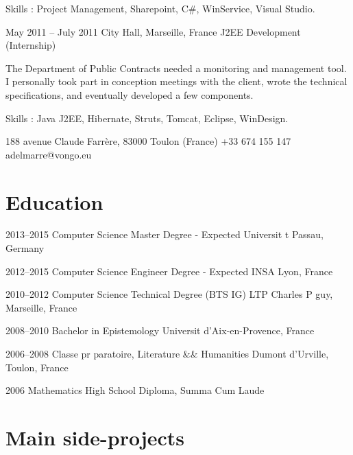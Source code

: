 \documentclass[fontsize=10pt]{tccv}
\begin{document}
\begin{eventlist}
Skills : Project Management, Sharepoint, C#, WinService, Visual Studio.

\item{May 2011 -- July 2011}
     {City Hall, Marseille, France}
     {J2EE Development (Internship)}

The Department of Public Contracts needed a monitoring and management tool.
I personally took part in conception meetings with the client, wrote the technical specifications, and eventually developed a few components.

Skills : Java J2EE, Hibernate, Struts, Tomcat, Eclipse, WinDesign.

\end{eventlist}

\personal
    {188 avenue Claude Farrère, 83000 Toulon (France)}
    {+33 674 155 147}
    {adelmarre@vongo.eu}

\section{Education}

\begin{list}

\item{2013--2015}
     {Computer Science Master Degree - Expected}
     {Universit t Passau, Germany}

\item{2012--2015}
     {Computer Science Engineer Degree - Expected}
     {INSA Lyon, France}

\item{2010--2012}
     {Computer Science Technical Degree (BTS IG)}
     {LTP Charles P guy, Marseille, France}

\item{2008--2010}
     {Bachelor in Epistemology}
     {Universit d'Aix-en-Provence, France}

\item{2006--2008}
     {Classe pr paratoire, Literature && Humanities}
     {Dumont d'Urville, Toulon, France}

\item{2006}
     {Mathematics High School Diploma, Summa Cum Laude}

\end{list}

\section{Main side-projects}
\end{document}
